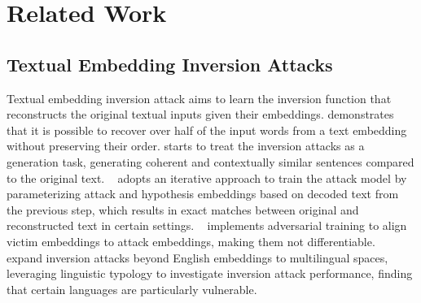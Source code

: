 \section{Related Work}
\subsection{Textual Embedding Inversion Attacks}
Textual embedding inversion attack aims to learn the inversion function that reconstructs the original textual inputs given their embeddings. 
\citet{10.1145/3372297.3417270} demonstrates that it is possible to recover over half of the input words from a text embedding without preserving their order.
\citet{li-etal-2023-sentence} starts to treat the inversion attacks as a generation task, generating coherent and contextually similar sentences compared to the original text.
~\citet{morris2023text} adopts an iterative approach to train the attack model by parameterizing attack and hypothesis embeddings based on decoded text from the previous step, which results in exact matches between original and reconstructed text in certain settings. 
~\citet{huang_transferable_2024} implements adversarial training to align victim embeddings to attack embeddings, making them not differentiable. 
~\citet{chen2024typ,chen2024text} expand inversion attacks beyond English embeddings to multilingual spaces, leveraging linguistic typology to investigate inversion attack performance, finding that certain languages are particularly vulnerable.

